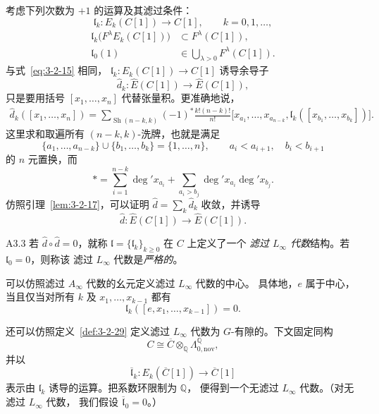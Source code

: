 考虑下列次数为 $+1$ 的运算及其滤过条件：
\[
 \mathfrak l_k\colon E_k(C[1])\longrightarrow C[1],
 \qquad k=0,1,\ldots,
\]
\begin{align}
 \mathfrak l_k\bigl(F^\lambda E_k(C[1])\bigr)
 &\subset F^\lambda(C[1]),
 \tag{A3.2.1}\label{eq:a3-2-1}\\
 \mathfrak l_0(1)
 &\in\bigcup_{\lambda>0}F^\lambda(C[1]).
 \tag{A3.2.2}\label{eq:a3-2-2}
\end{align}
与式~\eqref{eq:3-2-15} 相同，
$\mathfrak l_k\colon E_k(C[1])\to C[1]$ 诱导余导子
\[
 \widehat d_k\colon
 \widehat E(C[1])\longrightarrow\widehat E(C[1]),
\]
只是要用括号 $[x_1,\ldots,x_n]$ 代替张量积。更准确地说，
\[
\begin{aligned}
 \widehat d_k([x_1,\ldots,x_n])
 =\sum_{\operatorname{Sh}(n-k,k)}
 (-1)^*
 \frac{k!(n-k)!}{n!}
 \bigl[
 x_{a_1},\ldots,x_{a_{n-k}},
 \mathfrak l_k([x_{b_1},\ldots,x_{b_k}])
 \bigr].
\end{aligned}
\]
这里求和取遍所有 $(n-k,k)$-洗牌，也就是满足
\[
 \{a_1,\ldots,a_{n-k}\}\cup\{b_1,\ldots,b_k\}
 =\{1,\ldots,n\},\qquad
 a_i<a_{i+1},\quad b_i<b_{i+1}
\]
的 $n$ 元置换，而
\[
 *=\sum_{i=1}^{n-k}\deg' x_{a_i}
 +\sum_{a_i>b_j}\deg' x_{a_i}\deg' x_{b_j}.
\]
仿照引理~\ref{lem:3-2-17}，可以证明
$\widehat d=\sum_k\widehat d_k$ 收敛，并诱导
\[
 \widehat d\colon
 \widehat E(C[1])\longrightarrow\widehat E(C[1]).
\]

\begin{definition}{A3.3}\label{def:a3-3}
%
若 $\widehat d\circ\widehat d=0$，就称
$\mathfrak l=\{\mathfrak l_k\}_{k\geq0}$ 在 $C$ 上定义了一个
\emph{滤过 $L_\infty$ 代数}结构。若 $\mathfrak l_0=0$，则称该
滤过 $L_\infty$ 代数是\emph{严格的}。
\end{definition}

可以仿照滤过 $A_\infty$ 代数的幺元定义滤过 $L_\infty$ 代数的中心。
具体地，$e$ 属于中心，当且仅当对所有 $k$ 及
$x_1,\ldots,x_{k-1}$ 都有
\[
 \mathfrak l_k([e,x_1,\ldots,x_{k-1}])=0.
\]

还可以仿照定义~\ref{def:3-2-29} 定义滤过 $L_\infty$ 代数为
$G$-有隙的。下文固定同构
\[
 C\cong\overline C\otimes_{\mathbb Q}
 \Lambda^{\mathbb Q}_{0,\mathrm{nov}},
\]
并以
\[
 \overline{\mathfrak l}_k\colon
 E_k(\overline C[1])\longrightarrow\overline C[1]
\]
表示由 $\mathfrak l_k$ 诱导的运算。把系数环限制为 $\mathbb Q$，
便得到一个无滤过 $L_\infty$ 代数。（对无滤过 $L_\infty$ 代数，
我们假设 $\overline{\mathfrak l}_0=0$。）

